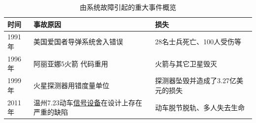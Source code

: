 \documentclass[9pt, CJK]{beamer}
\begin{document}
\begin{frame}
		\begin{table}[htbp]
			\setlength{\abovecaptionskip}{-0.2cm}  %
			\setlength{\belowcaptionskip}{-0.4cm} %
			\fontsize{7pt}{\baselineskip}\selectfont
			\caption{由系统故障引起的重大事件概览}
			\label{tab:systemEvents_1.1}
			\centering
			\begin{tabular}{p{}p{}p{}}%
				\toprule
				\textbf{时间}&\textbf{事故原因}&\textbf{损失}\\
				\midrule
				1991年 & 美国爱国者导弹系统舍入错误 & 28名士兵死亡、100人受伤等\\
				1996年 & 阿丽亚娜5火箭 代码重用 & 火箭与其它卫星毁灭\\
				1999年 & 火星探测器用错度量单位 & 探测器坠毁并造成了3.27亿美元的损失\\
				2011年 & 温州7.23动车\underline{信号设备}在设计上存在严重的缺陷 &动车脱节脱轨、多人失去生命\\
				\bottomrule
			\end{tabular}
		\end{table}
	\end{frame}
	
\end{document}
